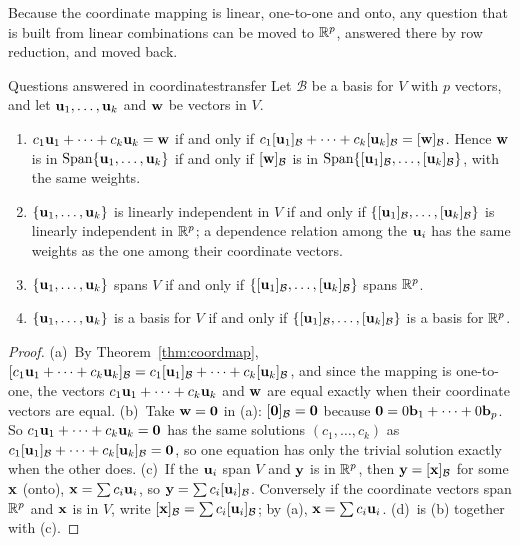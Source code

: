 \documentclass[11pt]{article}
\begin{document}
Because the coordinate mapping is linear, one-to-one and onto, any question that is built from linear combinations can be moved to $\mathbb{R}^p$, answered there by row reduction, and moved back.

\begin{thm}{Questions answered in coordinates}{transfer}
Let $\mathcal{B}$ be a basis for $V$ with $p$ vectors, and let $\mathbf{u}_1,\dots,\mathbf{u}_k$ and $\mathbf{w}$ be vectors in $V$.
\begin{enumerate}[label=(\alph*),itemsep=1pt]
  \item $c_1\mathbf{u}_1+\cdots+c_k\mathbf{u}_k=\mathbf{w}$ if and only if $c_1[\mathbf{u}_1]_{\mathcal{B}}+\cdots+c_k[\mathbf{u}_k]_{\mathcal{B}}=[\mathbf{w}]_{\mathcal{B}}$. Hence $\mathbf{w}$ is in $\operatorname{Span}\{\mathbf{u}_1,\dots,\mathbf{u}_k\}$ if and only if $[\mathbf{w}]_{\mathcal{B}}$ is in $\operatorname{Span}\{[\mathbf{u}_1]_{\mathcal{B}},\dots,[\mathbf{u}_k]_{\mathcal{B}}\}$, with the same weights.
  \item $\{\mathbf{u}_1,\dots,\mathbf{u}_k\}$ is linearly independent in $V$ if and only if $\{[\mathbf{u}_1]_{\mathcal{B}},\dots,[\mathbf{u}_k]_{\mathcal{B}}\}$ is linearly independent in $\mathbb{R}^p$; a dependence relation among the $\mathbf{u}_i$ has the same weights as the one among their coordinate vectors.
  \item $\{\mathbf{u}_1,\dots,\mathbf{u}_k\}$ spans $V$ if and only if $\{[\mathbf{u}_1]_{\mathcal{B}},\dots,[\mathbf{u}_k]_{\mathcal{B}}\}$ spans $\mathbb{R}^p$.
  \item $\{\mathbf{u}_1,\dots,\mathbf{u}_k\}$ is a basis for $V$ if and only if $\{[\mathbf{u}_1]_{\mathcal{B}},\dots,[\mathbf{u}_k]_{\mathcal{B}}\}$ is a basis for $\mathbb{R}^p$.
\end{enumerate}
\end{thm}

\begin{proof}
(a)~By Theorem~\ref{thm:coordmap}, $[c_1\mathbf{u}_1+\cdots+c_k\mathbf{u}_k]_{\mathcal{B}}=c_1[\mathbf{u}_1]_{\mathcal{B}}+\cdots+c_k[\mathbf{u}_k]_{\mathcal{B}}$, and since the mapping is one-to-one, the vectors $c_1\mathbf{u}_1+\cdots+c_k\mathbf{u}_k$ and $\mathbf{w}$ are equal exactly when their coordinate vectors are equal. (b)~Take $\mathbf{w}=\mathbf{0}$ in (a): $[\mathbf{0}]_{\mathcal{B}}=\mathbf{0}$ because $\mathbf{0}=0\mathbf{b}_1+\cdots+0\mathbf{b}_p$. So $c_1\mathbf{u}_1+\cdots+c_k\mathbf{u}_k=\mathbf{0}$ has the same solutions $(c_1,\dots,c_k)$ as $c_1[\mathbf{u}_1]_{\mathcal{B}}+\cdots+c_k[\mathbf{u}_k]_{\mathcal{B}}=\mathbf{0}$, so one equation has only the trivial solution exactly when the other does. (c)~If the $\mathbf{u}_i$ span $V$ and $\mathbf{y}$ is in $\mathbb{R}^p$, then $\mathbf{y}=[\mathbf{x}]_{\mathcal{B}}$ for some $\mathbf{x}$ (onto), $\mathbf{x}=\sum c_i\mathbf{u}_i$, so $\mathbf{y}=\sum c_i[\mathbf{u}_i]_{\mathcal{B}}$. Conversely if the coordinate vectors span $\mathbb{R}^p$ and $\mathbf{x}$ is in $V$, write $[\mathbf{x}]_{\mathcal{B}}=\sum c_i[\mathbf{u}_i]_{\mathcal{B}}$; by (a), $\mathbf{x}=\sum c_i\mathbf{u}_i$. (d)~is (b) together with (c).
\end{proof}
\end{document}
